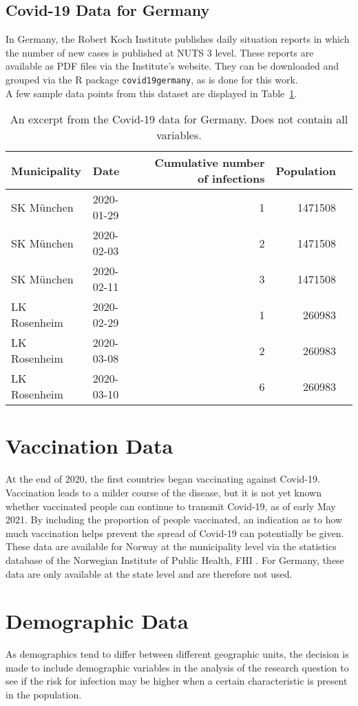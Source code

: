 \subsection{Covid-19 Data for Germany}
In Germany, the Robert Koch Institute publishes daily situation reports in which the number of new cases is published at NUTS 3 level. These reports are available as PDF files via the Institute's website. They can be downloaded and grouped via the R package \texttt{covid19germany}\autocite[][]{covid19germany}, as is done for this work.\\
A few sample data points from this dataset are displayed in Table~\ref{datasetGermany}.
\begin{table}[H] 
\caption{An excerpt from the Covid-19 data for Germany. Does not contain all variables.\label{datasetGermany}}
\begin{tabular}{l l r r r}
\toprule
\textbf{Municipality}	& \textbf{Date}	& \textbf{Cumulative number of infections} & \textbf{Population}\\
\midrule
SK München & 2020-01-29 & 1 & 1471508\\
SK München & 2020-02-03 & 2 & 1471508\\
SK München & 2020-02-11 & 3 & 1471508\\
LK Rosenheim & 2020-02-29 & 1 & 260983\\
LK Rosenheim & 2020-03-08 & 2 & 260983 \\
LK Rosenheim & 2020-03-10 & 6 & 260983 \\
\bottomrule
\end{tabular}
\end{table}
\clearpage
\section{Vaccination Data}
At the end of 2020, the first countries began vaccinating against Covid-19. Vaccination leads to a milder course of the disease, but it is not yet known whether vaccinated people can continue to transmit Covid-19, as of early May 2021. By including the proportion of people vaccinated, an indication as to how much vaccination helps prevent the spread of Covid-19 can potentially be given. These data are available for Norway at the municipality level via the statistics database of the Norwegian Institute of Public Health, FHI \autocite[][]{fhi}. For Germany, these data are only available at the state level and are therefore not used.
\clearpage
\section{Demographic Data}
As demographics tend to differ between different geographic units, the decision is made to include demographic variables in the analysis of the research question to see if the risk for infection may be higher when a certain characteristic is present in the population.
